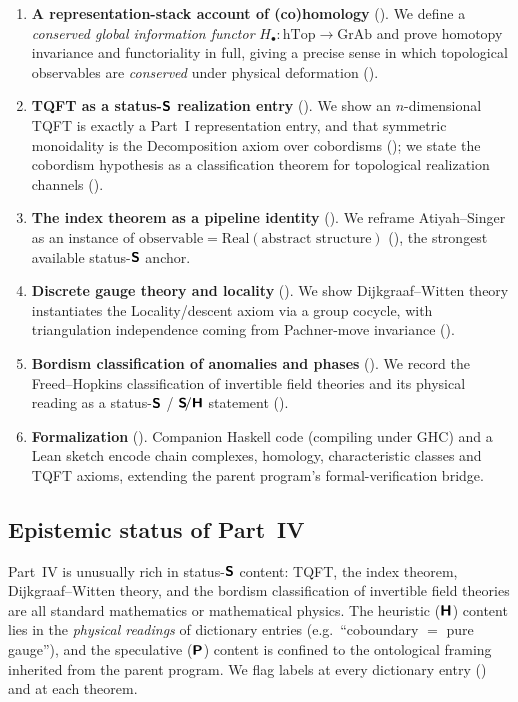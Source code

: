 \documentclass[12pt]{article}
\theoremstyle{definition}
\theoremstyle{remark}
\newcommand{\hTop}{\mathrm{hTop}}
\newcommand{\GrAb}{\mathrm{GrAb}}
\newcommand{\Real}{\mathrm{Real}}
\newcommand{\Sfont}{\textnormal{\sffamily\bfseries S}}
\newcommand{\Hfont}{\textnormal{\sffamily\bfseries H}}
\newcommand{\Pfont}{\textnormal{\sffamily\bfseries P}}
\begin{document}
\begin{enumerate}
  \item \textbf{A representation-stack account of (co)homology}
    (). We define a \emph{conserved global information functor}
    $H_\bullet\colon\hTop\to\GrAb$ and prove homotopy invariance and
    functoriality in full, giving a precise sense in which topological observables
    are \emph{conserved} under physical deformation ().
  \item \textbf{TQFT as a status-$\Sfont$ realization entry} ().
    We show an $n$-dimensional TQFT is exactly a Part~I representation entry, and
    that symmetric monoidality is the Decomposition axiom over cobordisms
    (); we state the cobordism hypothesis as a classification
    theorem for topological realization channels ().
  \item \textbf{The index theorem as a pipeline identity} ().
    We reframe Atiyah--Singer as an instance of
    $\text{observable}=\Real(\text{abstract structure})$
    (), the strongest available status-$\Sfont$ anchor.
  \item \textbf{Discrete gauge theory and locality} (). We show
    Dijkgraaf--Witten theory instantiates the Locality/descent axiom via a group
    cocycle, with triangulation independence coming from Pachner-move invariance
    ().
  \item \textbf{Bordism classification of anomalies and phases}
    (). We record the Freed--Hopkins classification of
    invertible field theories and its physical reading as a status-$\Sfont$ /
    $\Sfont\!/\Hfont$ statement ().
  \item \textbf{Formalization} (). Companion Haskell code
    (compiling under GHC) and a Lean sketch encode chain complexes, homology,
    characteristic classes and TQFT axioms, extending the parent program's
    formal-verification bridge.
\end{enumerate}

\subsection{Epistemic status of Part~IV}

Part~IV is unusually rich in status-$\Sfont$ content: TQFT, the index theorem,
Dijkgraaf--Witten theory, and the bordism classification of invertible field
theories are all standard mathematics or mathematical physics. The heuristic
($\Hfont$) content lies in the \emph{physical readings} of dictionary entries
(e.g.\ ``coboundary $=$ pure gauge''), and the speculative ($\Pfont$) content is
confined to the ontological framing inherited from the parent program. We flag
labels at every dictionary entry () and at each theorem.
\end{document}
